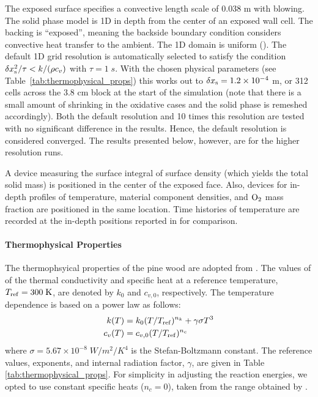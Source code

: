 The exposed surface specifies a convective length scale of 0.038 m with blowing. The solid phase model is 1D in depth from the center of an exposed wall cell.  The backing is ``exposed'', meaning the backside boundary condition considers convective heat transfer to the ambient.  The 1D domain is uniform ().  The default 1D grid resolution is automatically selected to satisfy the condition $\delta x_{\rm s}^2/\tau < k/(\rho c_v)$ with $\tau=1\;\si{s}$.  With the chosen physical parameters (see Table~\ref{tab:thermophysical_props}) this works out to $\delta x_{\rm s} = 1.2 \times 10^{-4}$ m, or 312 cells across the 3.8 cm block at the start of the simulation (note that there is a small amount of shrinking in the oxidative cases and the solid phase is remeshed accordingly).  Both the default resolution and 10 times this resolution are tested with no significant difference in the results.  Hence, the default resolution is considered converged.  The results presented below, however, are for the higher resolution runs.

A device measuring the surface integral of surface density (which yields the total solid mass) is positioned in the center of the exposed face.  Also, devices for in-depth profiles of temperature, material component densities, and ${\rm O}_2$ mass fraction are positioned in the same location.  Time histories of temperature are recorded at the in-depth positions reported in \cite{Kashiwagi:1987} for comparison.

\paragraph{Thermophysical Properties}

The thermophsyical properties of the pine wood are adopted from \cite{Lautenberger:2009}.  The values of of the thermal conductivity and specific heat at a reference temperature, $T_{\rm ref}=300 \;\si{K}$, are denoted by $k_0$ and $c_{v,0}$, respectively. The temperature dependence is based on a power law as follows:
\begin{align}
k(T)   &= k_0 (T/T_{\rm ref})^{n_k} + \gamma \sigma T^3 \\
c_v(T) &= c_{v,0} (T/T_{\rm ref})^{n_c}
\end{align}
where $\sigma=5.67\times10^{-8} \;\si{W/m^2/K^4}$ is the Stefan-Boltzmann constant. The reference values, exponents, and internal radiation factor, $\gamma$, are given in Table \ref{tab:thermophysical_props}.  For simplicity in adjusting the reaction energies, we opted to use constant specific heats ($n_c=0$), taken from the range obtained by \cite{Lautenberger:2009}.

